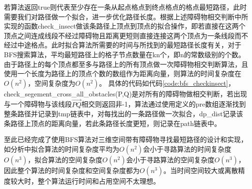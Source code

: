 
\par 若算法返回true则代表至少存在一条从起点格点到终点格点的格点最短路径，此时需要我们对路径做一个拟合，进一步优化路径长度。根据上述障碍物相交判断中所实现的函数check\_insect做该条路径上顶点到顶点的拟合操作，即若直接在这两个顶点之间连成线段不经过障碍物且距离更短则直接连接这两个顶点为一条线段而不经过中途格点。此时拟合算法所需要的时间与所找到的最短路径长度有关，对于BFS搜索算法，平均最短路径上的格子节点数量在kn个，即n的常数级别的个数。
由于路径上的每个顶点都至多与路径上的所有顶点做一次障碍物相交判断算法，且使用一个长度为路径上的顶点个数的数组作为距离向量，则算法的时间复杂度在$O(n^2)$，空间复杂度为$O(n^2)$。
具体的代码如代码\ref{code:bfs_checkinsect}，check\_segement\_cross\_all\_obstacles(P,Q)是对所有的障碍物做相交判断，若出现与一个障碍物与该线段$\vec{PQ}$相交则返回非-1，算法通过使用定义的pre数组逐渐找到整条路径并记录到tmp链表中，对每找出的一条路径做一次拟合，dp\_dist记录该条路径上顶点的距离向量，若此条路径长度更短，则记录在path链表中。

\par 至此已经完成了使用BFS算法对三维空间带有障碍物寻找最短路径的设计和实现，如分析中拟合算法的时间复杂度平均为$O(n^2)$会小于寻路算法的时间复杂度$O(n^3)$，拟合算法的空间复杂度$O(n^2)$会小于寻路算法的空间复杂度$O(n^3)$，因此整个算法的时间复杂度和空间复杂度都为$O(n^3)$。当时间空间较大或离散精度较大时，整个算法运行时间和占用空间不太理想。

